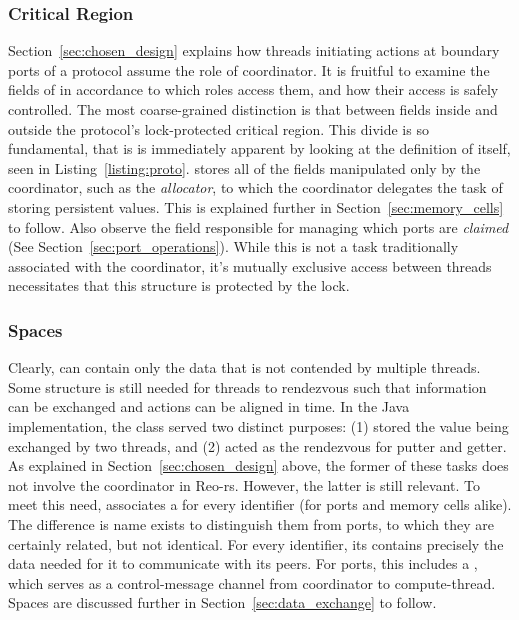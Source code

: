 \subsubsection{Critical Region}
Section~\ref{sec:chosen_design} explains how threads initiating actions at boundary ports of a protocol assume the role of coordinator. It is fruitful to examine the fields of  in accordance to which roles access them, and how their access is safely controlled. The most coarse-grained distinction is that between fields inside and outside the protocol's lock-protected critical region. This divide is so fundamental, that is is immediately apparent by looking at the definition of  itself, seen in Listing~\ref{listing:proto}.  stores all of the fields manipulated only by the coordinator, such as the \textit{allocator}, to which the coordinator delegates the task of storing persistent values. This is explained further in Section~\ref{sec:memory_cells} to follow. Also observe the field responsible for managing which ports are \textit{claimed} (See Section~\ref{sec:port_operations}). While this is not a task traditionally associated with the coordinator, it's mutually exclusive access between threads necessitates that this structure is protected by the lock. 

\subsubsection{Spaces}
Clearly,  can contain only the data that is not contended by multiple threads. Some structure is still needed for threads to rendezvous such that information can be exchanged and actions can be aligned in time. In the Java implementation, the class  served two distinct purposes: (1) stored the value being exchanged by two threads, and (2) acted as the rendezvous for putter and getter. As explained in Section~\ref{sec:chosen_design} above, the former of these tasks does not involve the coordinator in Reo-rs. However, the latter is still relevant. To meet this need,  associates a  for every identifier (for ports and memory cells alike). The difference is name exists to distinguish them from ports, to which they are certainly related, but not identical. For every identifier, its  contains precisely the data needed for it to communicate with its peers. For ports, this includes a , which serves as a control-message channel from coordinator to compute-thread. Spaces are discussed further in Section~\ref{sec:data_exchange} to follow. 


